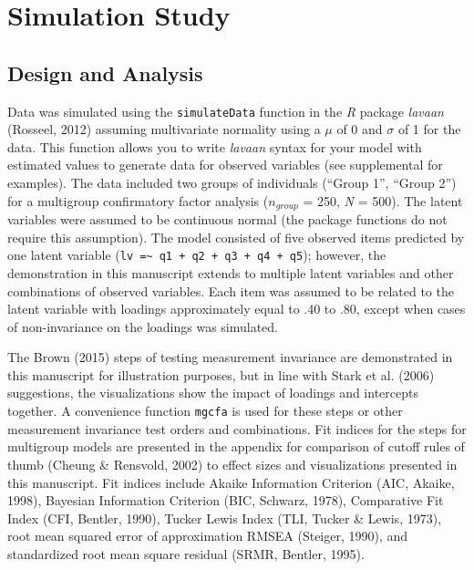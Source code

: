 \documentclass[
  man,floatsintext]{apa7}
\begin{document}
\section{Simulation Study}\label{simulation-study}

\subsection{Design and Analysis}\label{design-and-analysis}

Data was simulated using the \texttt{simulateData} function in the \emph{R} package \emph{lavaan} (Rosseel, 2012) assuming multivariate normality using a \(\mu\) of 0 and \(\sigma\) of 1 for the data. This function allows you to write \emph{lavaan} syntax for your model with estimated values to generate data for observed variables (see supplemental for examples). The data included two groups of individuals (``Group 1'', ``Group 2'') for a multigroup confirmatory factor analysis (\(n_{group}\) = 250, \emph{N} = 500). The latent variables were assumed to be continuous normal (the package functions do not require this assumption). The model consisted of five observed items predicted by one latent variable (\texttt{lv\ =\textasciitilde{}\ q1\ +\ q2\ +\ q3\ +\ q4\ +\ q5}); however, the demonstration in this manuscript extends to multiple latent variables and other combinations of observed variables. Each item was assumed to be related to the latent variable with loadings approximately equal to .40 to .80, except when cases of non-invariance on the loadings was simulated.

The Brown (2015) steps of testing measurement invariance are demonstrated in this manuscript for illustration purposes, but in line with Stark et al. (2006) suggestions, the visualizations show the impact of loadings and intercepts together. A convenience function \texttt{mgcfa} is used for these steps or other measurement invariance test orders and combinations. Fit indices for the steps for multigroup models are presented in the appendix for comparison of cutoff rules of thumb (Cheung \& Rensvold, 2002) to effect sizes and visualizations presented in this manuscript. Fit indices include Akaike Information Criterion (AIC, Akaike, 1998), Bayesian Information Criterion (BIC, Schwarz, 1978), Comparative Fit Index (CFI, Bentler, 1990), Tucker Lewis Index (TLI, Tucker \& Lewis, 1973), root mean squared error of approximation RMSEA (Steiger, 1990), and standardized root mean square residual (SRMR, Bentler, 1995).
\end{document}
